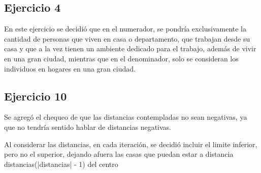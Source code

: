 \documentclass[a4paper]{article}
\begin{document}
\subsection{Ejercicio 4}
En este ejercicio se decidió que en el numerador, se pondría exclusivamente la cantidad de personas que viven en casa o departamento, que trabajan desde su casa y que a la vez tienen un ambiente dedicado para el trabajo, además de vivir en una gran ciudad, mientras que en el denominador, solo se consideran los individuos en hogares en una gran ciudad.

\subsection{Ejercicio 10}
Se agregó el chequeo de que las distancias contempladas no sean negativas, ya que no tendría sentido hablar de distancias negativas.

Al considerar las distancias, en cada iteración, se decidió incluir el limite inferior, pero no el superior, dejando afuera las casas que puedan estar a distancia distancias(|distancias| - 1) del centro
\end{document}
